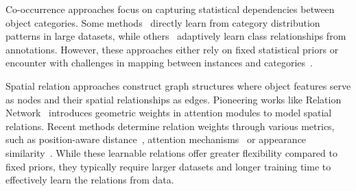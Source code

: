 Co-occurrence approaches focus on capturing statistical dependencies between object categories. Some methods~\cite{krishna2017visual,xu2019reasoning} directly learn from category distribution patterns in large datasets, while others~\cite{chen2018iterative,hao2023relation} adaptively learn class relationships from annotations. However, these approaches either rely on fixed statistical priors or encounter with challenges in mapping between instances and categories~\cite{xu2019reasoning}.

Spatial relation approaches construct graph structures where object features serve as nodes and their spatial relationships as edges. Pioneering works like Relation Network~\cite{hu2018relation} introduces geometric weights in attention modules to model spatial relations. Recent methods determine relation weights through various metrics, such as position-aware distance~\cite{bi2022srrv,lin2021core}, attention mechanisms~\cite{zhao2021,vaswani2017attention} or appearance similarity~\cite{li2020gar}. While these learnable relations offer greater flexibility compared to fixed priors, they typically require larger datasets and longer training time to effectively learn the relations from data.